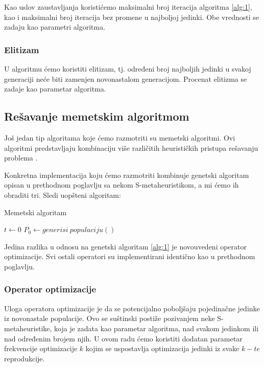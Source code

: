 \documentclass[12pt, a4paper]{article}
\theoremstyle{definition}
\begin{document}
Kao uslov zaustavljanja koristićemo maksimalni broj iteracija algoritma \ref{alg:1}, kao i maksimalni broj iteracija bez promene u najboljoj jedinki. Obe vrednosti se zadaju kao parametri algoritma.

\subsubsection{Elitizam}

U algoritmu ćemo koristiti elitizam, tj. određeni broj najboljih jedinki u svakoj generaciji neće biti zamenjen novonastalom generacijom. Procenat elitizma se zadaje kao parametar algoritma.

\subsection{Rešavanje memetskim algoritmom}

Još jedan tip algoritama koje ćemo razmotriti su memetski algoritmi. Ovi algoritmi predstavljaju kombinaciju više različitih heurističkih pristupa rešavanju problema \cite{4}.

Konkretna implementacija koju ćemo razmotriti kombinuje genetski algoritam opisan u prethodnom poglavlju sa nekom S-metaheuristikom, a mi ćemo ih obraditi tri. Sledi uopšteni algoritam:

\begin{algorithm}
\caption{Memetski algoritam}
\label{alg:2}
$t \gets 0$\;
$P_0 \gets generisi\ populaciju()$\;
\end{algorithm}

Jedina razlika u odnosu na genetski algoritam \ref{alg:1} je novouvedeni operator optimizacije. Svi ostali operatori su implementirani identično kao u prethodnom poglavlju.

\subsubsection{Operator optimizacije}

Uloga operatora optimizacije je da se potencijalno poboljšaju pojedinačne jedinke iz novonastale populacije. Ovo se suštinski postiže pozivanjem neke S-metaheuristike, koja je zadata kao parametar algoritma, nad svakom jedinkom ili nad određenim brojem njih. U ovom radu ćemo koristiti dodatan parametar frekvencije optimizacije $k$ kojim se uspostavlja optimizacija jedinki iz svake $k-te$ reprodukcije.
\end{document}
